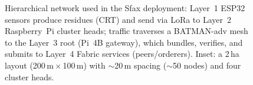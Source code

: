 \documentclass[12pt,onecolumn]{IEEEtran} %
\begin{document}
\begin{figure}[htbp]
\begin{adjustbox}{max width=\linewidth}
  \end{adjustbox}
  \caption{Hierarchical network used in the Sfax deployment: Layer~1 ESP32 sensors produce residues (CRT) and send via LoRa to Layer~2 Raspberry~Pi cluster heads; traffic traverses a BATMAN-adv mesh to the Layer~3 root (Pi~4B gateway), which bundles, verifies, and submits to Layer~4 Fabric services (peers/orderers). Inset: a 2\,ha layout (200\,m\,$\times$\,100\,m) with $\sim$20\,m spacing ($\sim$50 nodes) and four cluster heads.}
  \label{fig:network-architecture}
\end{figure}
\end{document}
